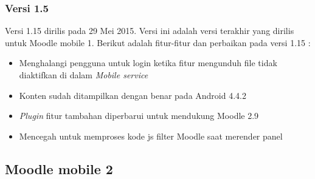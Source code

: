 \subsubsection{Versi 1.5}
Versi 1.15 dirilis pada 29 Mei 2015. Versi ini adalah versi terakhir yang dirilis untuk Moodle mobile 1. Berikut adalah fitur-fitur dan perbaikan pada versi 1.15 : \cite{Moodlemobile:version1:intro}
	\begin{itemize}
		\item Menghalangi pengguna untuk login ketika fitur mengunduh file tidak diaktifkan di dalam \textit{Mobile service}
		\item Konten sudah ditampilkan dengan benar pada Android 4.4.2
		\item \textit{Plugin} fitur tambahan diperbarui untuk mendukung Moodle 2.9
		\item Mencegah untuk memproses kode js filter Moodle saat merender panel
	\end{itemize}

\subsection{Moodle mobile 2}